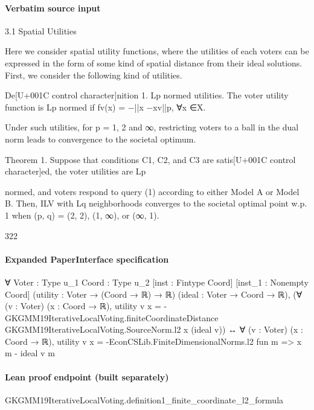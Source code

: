 \documentclass[10pt]{article}
\begin{document}
\paragraph{Verbatim source input}
\begin{ReviewVerbatim}
3.1 Spatial Utilities

Here we consider spatial utility functions, where the utilities of each voters can be expressed
in the form of some kind of spatial distance from their ideal solutions. First, we consider
the following kind of utilities.

De[U+001C control character]nition 1. Lp normed utilities. The voter utility function is Lp normed if fv(x) =
−||x −xv||p, ∀x ∈X.

Under such utilities, for p = 1, 2 and ∞, restricting voters to a ball in the dual norm
leads to convergence to the societal optimum.

Theorem 1. Suppose that conditions C1, C2, and C3 are satis[U+001C control character]ed, the voter utilities are Lp

normed, and voters respond to query (1) according to either Model A or Model B. Then,
ILV with Lq neighborhoods converges to the societal optimal point w.p. 1 when (p, q) = (2, 2),
(1, ∞), or (∞, 1).

322
\end{ReviewVerbatim}


\paragraph{Expanded PaperInterface specification}
\begin{ReviewVerbatim}
∀ {Voter : Type u_1} {Coord : Type u_2} [inst : Fintype Coord] [inst_1 : Nonempty Coord]
  (utility : Voter → (Coord → ℝ) → ℝ) (ideal : Voter → Coord → ℝ),
  (∀ (v : Voter) (x : Coord → ℝ),
      utility v x =
        -GKGMM19IterativeLocalVoting.finiteCoordinateDistance GKGMM19IterativeLocalVoting.SourceNorm.l2 x (ideal v)) ↔
    ∀ (v : Voter) (x : Coord → ℝ), utility v x = -EconCSLib.FiniteDimensionalNorms.l2 fun m => x m - ideal v m
\end{ReviewVerbatim}

\paragraph{Lean proof endpoint (built separately)}\begin{ReviewVerbatim}
GKGMM19IterativeLocalVoting.definition1_finite_coordinate_l2_formula
\end{ReviewVerbatim}
\end{document}
